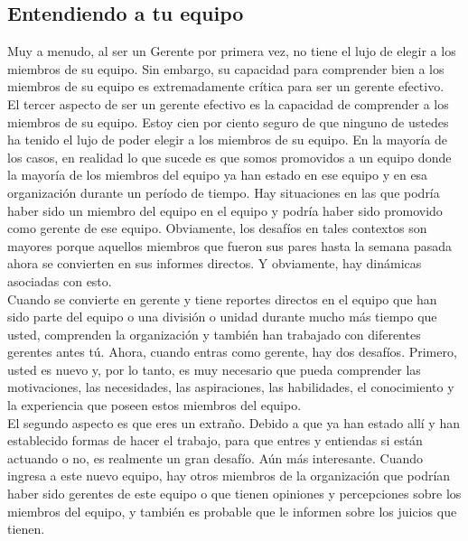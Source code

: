 \documentclass[10pt]{book}
\begin{document}
\subsection{Entendiendo a tu equipo}
Muy a menudo, al ser un Gerente por primera vez,  no tiene el lujo de elegir a los miembros de su equipo. Sin embargo, su capacidad para comprender bien a los miembros de su equipo es extremadamente crítica para ser un gerente efectivo.\\
El tercer aspecto de ser un gerente efectivo es la capacidad de comprender a los miembros de su equipo. Estoy cien por ciento seguro de que ninguno de ustedes ha tenido el lujo de poder elegir a los miembros de su equipo. En la mayoría de los casos, en realidad lo que sucede es que somos promovidos a un equipo donde la mayoría de los miembros del equipo ya han estado en ese equipo y en esa organización durante un período de tiempo. Hay situaciones en las que podría haber sido un miembro del equipo en el equipo y podría haber sido promovido como gerente de ese equipo. Obviamente, los desafíos en tales contextos son mayores porque aquellos miembros que fueron sus pares hasta la semana pasada ahora se convierten en sus informes directos. Y obviamente, hay dinámicas asociadas con esto.\\
Cuando se convierte en gerente y tiene reportes directos en el equipo que han sido parte del equipo o una división o unidad durante mucho más tiempo que usted, comprenden la organización y también han trabajado con diferentes gerentes antes tú. Ahora, cuando entras como gerente, hay dos desafíos. Primero, usted es nuevo y, por lo tanto, es muy necesario que pueda comprender las motivaciones, las necesidades, las aspiraciones, las habilidades, el conocimiento y la experiencia que poseen estos miembros del equipo.\\
El segundo aspecto es que eres un extraño. Debido a que ya han estado allí y han establecido formas de hacer el trabajo, para que entres y entiendas si están actuando o no, es realmente un gran desafío. Aún más interesante. Cuando ingresa a este nuevo equipo, hay otros miembros de la organización que podrían haber sido gerentes de este equipo o que tienen opiniones y percepciones sobre los miembros del equipo, y también es probable que le informen sobre los juicios que tienen.\\
\end{document}
